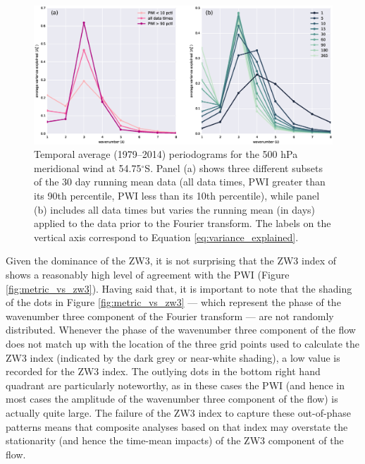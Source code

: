 \begin{figure}
\begin{center}
\includegraphics[width=1\columnwidth]{figures/zonalwaves/va-r2spectrum_ERAInterim_500hPa_daily_native-55S.eps}
\caption[Temporal average (1979--2014) periodograms for the 500 hPa meridional wind at 54.75$^{\circ}$S]{\label{fig:periodograms}
Temporal average (1979--2014) periodograms for the 500 hPa meridional wind at 54.75$^{\circ}$S. Panel (a) shows three different subsets of the 30 day running mean data (all data times, PWI greater than its 90th percentile, PWI less than its 10th percentile), while panel (b) includes all data times but varies the running mean (in days) applied to the data prior to the Fourier transform. The labels on the vertical axis correspond to Equation \ref{eq:variance_explained}.}
\end{center}
\end{figure}


Given the dominance of the ZW3, it is not surprising that the ZW3 index of \citet{Raphael2004} shows a reasonably high level of agreement with the PWI (Figure \ref{fig:metric_vs_zw3}). Having said that, it is important to note that the shading of the dots in Figure \ref{fig:metric_vs_zw3} --- which represent the phase of the wavenumber three component of the Fourier transform --- are not randomly distributed. Whenever the phase of the wavenumber three component of the flow does not match up with the location of the three grid points used to calculate the ZW3 index (indicated by the dark grey or near-white shading), a low value is recorded for the ZW3 index. The outlying dots in the bottom right hand quadrant are particularly noteworthy, as in these cases the PWI (and hence in most cases the amplitude of the wavenumber three component of the flow) is actually quite large. The failure of the ZW3 index to capture these out-of-phase patterns means that composite analyses based on that index may overstate the stationarity (and hence the time-mean impacts) of the ZW3 component of the flow.

